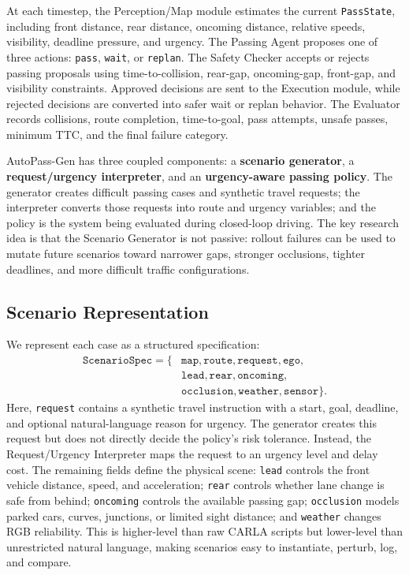 \documentclass[10pt,twocolumn,letterpaper]{article}
\begin{document}
At each timestep, the Perception/Map module estimates the current \texttt{PassState}, including front distance, rear distance, oncoming distance, relative speeds, visibility, deadline pressure, and urgency. The Passing Agent proposes one of three actions: \texttt{pass}, \texttt{wait}, or \texttt{replan}. The Safety Checker accepts or rejects passing proposals using time-to-collision, rear-gap, oncoming-gap, front-gap, and visibility constraints. Approved decisions are sent to the Execution module, while rejected decisions are converted into safer wait or replan behavior. The Evaluator records collisions, route completion, time-to-goal, pass attempts, unsafe passes, minimum TTC, and the final failure category.

AutoPass-Gen has three coupled components: a \textbf{scenario generator}, a \textbf{request/urgency interpreter}, and an \textbf{urgency-aware passing policy}. The generator creates difficult passing cases and synthetic travel requests; the interpreter converts those requests into route and urgency variables; and the policy is the system being evaluated during closed-loop driving. The key research idea is that the Scenario Generator is not passive: rollout failures can be used to mutate future scenarios toward narrower gaps, stronger occlusions, tighter deadlines, and more difficult traffic configurations.

\subsection{Scenario Representation}
We represent each case as a structured specification:
\begin{align*}
\texttt{ScenarioSpec} = \{&\texttt{map}, \texttt{route}, \texttt{request}, \texttt{ego}, \\
&\texttt{lead}, \texttt{rear}, \texttt{oncoming}, \\
&\texttt{occlusion}, \texttt{weather}, \texttt{sensor} \}.
\end{align*}
Here, \texttt{request} contains a synthetic travel instruction with a start, goal, deadline, and optional natural-language reason for urgency. The generator creates this request but does not directly decide the policy's risk tolerance. Instead, the Request/Urgency Interpreter maps the request to an urgency level and delay cost. The remaining fields define the physical scene: \texttt{lead} controls the front vehicle distance, speed, and acceleration; \texttt{rear} controls whether lane change is safe from behind; \texttt{oncoming} controls the available passing gap; \texttt{occlusion} models parked cars, curves, junctions, or limited sight distance; and \texttt{weather} changes RGB reliability. This is higher-level than raw CARLA scripts but lower-level than unrestricted natural language, making scenarios easy to instantiate, perturb, log, and compare.
\end{document}
